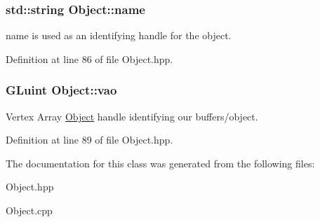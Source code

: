 \hypertarget{class_object_a24457e0a387492c80594aec7681a2277}{
\subsubsection[{name}]{\setlength{\rightskip}{0pt plus 5cm}std\-::string Object\-::name\hspace{0.3cm}{\ttfamily [protected]}}}\label{class_object_a24457e0a387492c80594aec7681a2277}


name is used as an identifying handle for the object. 



Definition at line 86 of file Object.\-hpp.

\hypertarget{class_object_a66190fee29d03d6478516686cbd01eb8}{
\subsubsection[{vao}]{\setlength{\rightskip}{0pt plus 5cm}G\-Luint Object\-::vao\hspace{0.3cm}{\ttfamily [protected]}}}\label{class_object_a66190fee29d03d6478516686cbd01eb8}


Vertex Array \hyperlink{class_object}{Object} handle identifying our buffers/object. 



Definition at line 89 of file Object.\-hpp.



The documentation for this class was generated from the following files\-:\begin{DoxyCompactItemize}
\item 
Object.\-hpp\item 
Object.\-cpp\end{DoxyCompactItemize}

